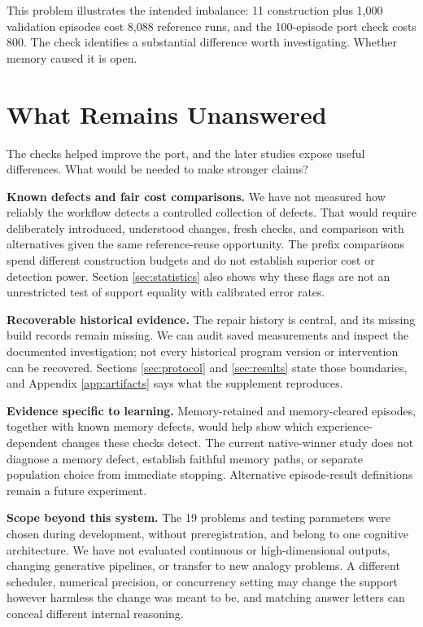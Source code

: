 \documentclass[10pt,letterpaper]{article}
\begin{document}
This problem illustrates the intended imbalance: 11 construction plus 1,000 validation
episodes cost 8,088 reference runs, and the 100-episode port check costs 800. The check
identifies a substantial difference worth investigating. Whether memory caused it is open.

\section{What Remains Unanswered}\label{sec:limits}

The checks helped improve the port, and the later studies expose useful differences. What
would be needed to make stronger claims?

\textbf{Known defects and fair cost comparisons.} We have not measured how reliably the
workflow detects a controlled collection of defects. That would require deliberately
introduced, understood changes, fresh checks, and comparison with alternatives given the
same reference-reuse opportunity. The prefix comparisons spend different construction
budgets and do not establish superior cost or detection power. Section
\ref{sec:statistics} also shows why these flags are not an unrestricted test of support
equality with calibrated error rates.

\textbf{Recoverable historical evidence.} The repair history is central, and its missing
build records remain missing. We can audit saved measurements and inspect the documented
investigation; not every historical program version or intervention can be recovered.
Sections \ref{sec:protocol} and \ref{sec:results} state those boundaries, and Appendix
\ref{app:artifacts} says what the supplement reproduces.

\textbf{Evidence specific to learning.} Memory-retained and memory-cleared episodes,
together with known memory defects, would help show which experience-dependent changes
these checks detect. The current native-winner study does not diagnose a memory defect,
establish faithful memory paths, or separate population choice from immediate stopping.
Alternative episode-result definitions remain a future experiment.

\textbf{Scope beyond this system.} The 19 problems and testing parameters were chosen
during development, without preregistration, and belong to one cognitive architecture. We
have not evaluated continuous or high-dimensional outputs, changing generative pipelines,
or transfer to new analogy problems. A different scheduler, numerical precision, or
concurrency setting may change the support however harmless the change was meant to be,
and matching answer letters can conceal different internal reasoning.
\end{document}
